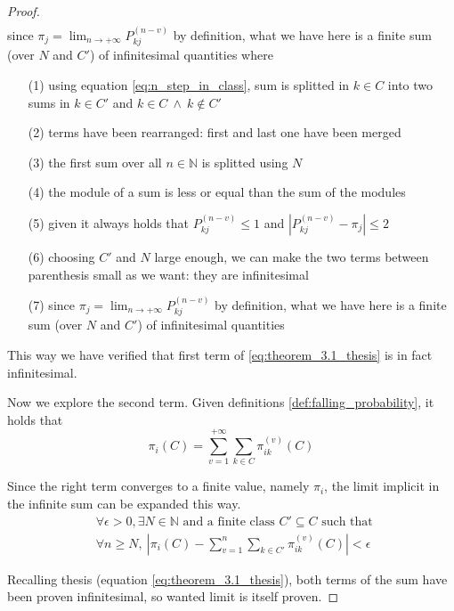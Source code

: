 \begin{proof}
\begin{equation}
\begin{split}
		\end{split}\end{equation}since $\pi_j = \lim_{n \to +\infty} P_{kj}^{(n-v)}$ by definition, what we have here is a finite sum (over $N$ and $C'$) of infinitesimal quantities
		where
		\begin{itemize}
			\item [(1)] using equation \ref{eq:n_step_in_class}, sum is splitted in $k \in C$ into two sums in $k \in C'$ and $k \in C ~ \wedge ~ k \notin C' $
			\item [(2)] terms have been rearranged: first and last one have been merged
			\item [(3)] the first sum over all $n \in \mathbb{N}$ is splitted using $N$
			\item [(4)] the module of a sum is less or equal than the sum of the modules
			\item [(5)] given it always holds that $P_{kj}^{(n-v)} \le 1$ and $|P_{kj}^{(n-v)} - \pi_j| \le 2$
			\item [(6)] choosing $C'$ and $N$ large enough, we can make the two terms between parenthesis small as we want: they are infinitesimal
			\item [(7)] since $\pi_j = \lim_{n \to +\infty} P_{kj}^{(n-v)}$ by definition, what we have here is a finite sum (over $N$ and $C'$) of infinitesimal quantities
		\end{itemize}
		This way we have verified that first term of \ref{eq:theorem_3.1_thesis} is in fact infinitesimal.

		\bigbreak
		Now we explore the second term.
		Given definitions \ref{def:falling_probability}, it holds that
		$$ \pi_i(C) = \sum_{v = 1}^{+\infty} \sum_{k \in C} \pi_{ik}^{(v)}(C) $$

		\smallbreak
		Since the right term converges to a finite value, namely $\pi_i$, the limit implicit in the infinite sum can be expanded this way.
		\begin{equation}\begin{split} \label{eq:pi_limit_definition}
			& \forall \epsilon > 0, \exists N \in \mathbb{N} \text{ and a finite class } C' \subseteq C \text{ such that } \\
			& \forall n \ge N,~ \left| \pi_i(C) - \sum_{v = 1}^{n} \sum_{k \in C'} \pi_{ik}^{(v)}(C) \right| < \epsilon
		\end{split}\end{equation}

		\bigbreak
		Recalling thesis (equation \ref{eq:theorem_3.1_thesis}), both terms of the sum have been proven infinitesimal, so wanted limit is itself proven.
	\end{proof}

